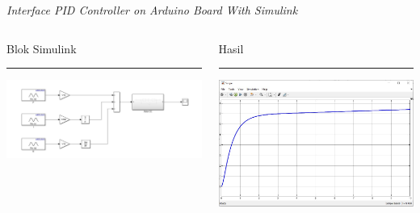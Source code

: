 \documentclass[10pt,xcolor={dvipsnames}]{beamer}
\begin{document}
\begin{frame}{\textit{Interface PID Controller on Arduino Board With Simulink}}
	\begin{columns}[T] %
		\begin{column}{0.48\textwidth}
			Blok Simulink
			\color{black}\rule{\linewidth}{4pt}
			\includegraphics[width=7.5cm]{Gambar Lain/asimulink_pid.jpg}
		\end{column}%
		\hfill%
		\begin{column}{0.48\textwidth}
			Hasil
			\color{blue}\rule{\linewidth}{4pt}
			\begin{center}
				\includegraphics[width=7.5cm]{Hasil Matlab/scopesys.jpg}
			\end{center}
		\end{column}
	\end{columns}
\end{frame}

\end{document}
